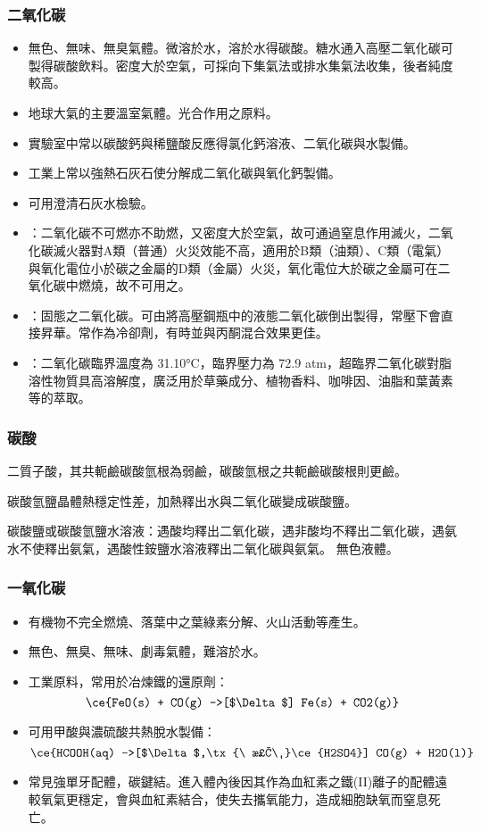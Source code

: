 \documentclass[a4paper,12pt]{report}
\begin{document}
\subsubsection{二氧化碳}
\begin{itemize}
\item 無色、無味、無臭氣體。微溶於水，溶於水得碳酸。糖水通入高壓二氧化碳可製得碳酸飲料。密度大於空氣，可採向下集氣法或排水集氣法收集，後者純度較高。
\item 地球大氣的主要溫室氣體。光合作用之原料。
\item 實驗室中常以碳酸鈣與稀鹽酸反應得氯化鈣溶液、二氧化碳與水製備。
\item 工業上常以強熱石灰石使分解成二氧化碳與氧化鈣製備。
\item 可用澄清石灰水檢驗。
\item {}：二氧化碳不可燃亦不助燃，又密度大於空氣，故可通過窒息作用滅火，二氧化碳滅火器對A類（普通）火災效能不高，適用於B類（油類）、C類（電氣）與氧化電位小於碳之金屬的D類（金屬）火災，氧化電位大於碳之金屬可在二氧化碳中燃燒，故不可用之。
\item {}：固態之二氧化碳。可由將高壓鋼瓶中的液態二氧化碳倒出製得，常壓下會直接昇華。常作為冷卻劑，有時並與丙酮混合效果更佳。
\item {}：二氧化碳臨界溫度為 31.10°C，臨界壓力為 72.9 atm，超臨界二氧化碳對脂溶性物質具高溶解度，廣泛用於草藥成分、植物香料、咖啡因、油脂和葉黃素等的萃取。
\end{itemize}
\subsubsection{碳酸}
\bit
\item 二質子酸，其共軛鹼碳酸氫根為弱鹼，碳酸氫根之共軛鹼碳酸根則更鹼。
\item 碳酸氫鹽晶體熱穩定性差，加熱釋出水與二氧化碳變成碳酸鹽。
\item 碳酸鹽或碳酸氫鹽水溶液：遇酸均釋出二氧化碳，遇非酸均不釋出二氧化碳，遇氨水不使釋出氨氣，遇酸性銨鹽水溶液釋出二氧化碳與氨氣。
\eit
{}
無色液體。
\subsubsection{一氧化碳}
\begin{itemize}
\item 有機物不完全燃燒、落葉中之葉綠素分解、火山活動等產生。
\item 無色、無臭、無味、劇毒氣體，難溶於水。
\item 工業原料，常用於冶煉鐵的還原劑：
\[\ce{FeO(s) + CO(g) ->[$\Delta$] Fe(s) + CO2(g)}\]
\item 可用甲酸與濃硫酸共熱脫水製備：
\[\ce{HCOOH(aq) ->[$\Delta$,\tx{\ 濃\ }\ce{H2SO4}] CO(g) + H2O(l)}\]
\item 常見強單牙配體，碳鍵結。進入體內後因其作為血紅素之鐵(II)離子的配體遠較氧氣更穩定，會與血紅素結合，使失去攜氧能力，造成細胞缺氧而窒息死亡。
\end{itemize}
\end{document}
